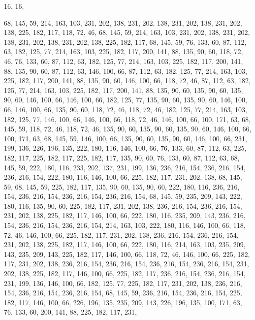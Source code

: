 16, 16,

68, 145, 59, 214, 163, 103, 231, 202, 138, 231, 202, 138, 231, 202, 138, 231,
202, 138, 225, 182, 117, 118, 72, 46, 68, 145, 59, 214, 163, 103, 231, 202,
138, 231, 202, 138, 231, 202, 138, 231, 202, 138, 225, 182, 117, 68, 145, 59,
76, 133, 60, 87, 112, 63, 182, 125, 77, 214, 163, 103, 225, 182, 117, 200,
141, 88, 135, 90, 60, 118, 72, 46, 76, 133, 60, 87, 112, 63, 182, 125,
77, 214, 163, 103, 225, 182, 117, 200, 141, 88, 135, 90, 60, 87, 112, 63,
146, 100, 66, 87, 112, 63, 182, 125, 77, 214, 163, 103, 225, 182, 117, 200,
141, 88, 135, 90, 60, 146, 100, 66, 118, 72, 46, 87, 112, 63, 182, 125,
77, 214, 163, 103, 225, 182, 117, 200, 141, 88, 135, 90, 60, 135, 90, 60,
135, 90, 60, 146, 100, 66, 146, 100, 66, 182, 125, 77, 135, 90, 60, 135,
90, 60, 146, 100, 66, 146, 100, 66, 135, 90, 60, 118, 72, 46, 118, 72,
46, 182, 125, 77, 214, 163, 103, 182, 125, 77, 146, 100, 66, 146, 100, 66,
118, 72, 46, 146, 100, 66, 100, 171, 63, 68, 145, 59, 118, 72, 46, 118,
72, 46, 135, 90, 60, 135, 90, 60, 135, 90, 60, 146, 100, 66, 100, 171,
63, 68, 145, 59, 146, 100, 66, 135, 90, 60, 135, 90, 60, 146, 100, 66,
231, 199, 136, 226, 196, 135, 222, 180, 116, 146, 100, 66, 76, 133, 60, 87,
112, 63, 225, 182, 117, 225, 182, 117, 225, 182, 117, 135, 90, 60, 76, 133,
60, 87, 112, 63, 68, 145, 59, 222, 180, 116, 233, 202, 137, 231, 199, 136,
236, 216, 154, 236, 216, 154, 236, 216, 154, 222, 180, 116, 146, 100, 66, 225,
182, 117, 231, 202, 138, 68, 145, 59, 68, 145, 59, 225, 182, 117, 135, 90,
60, 135, 90, 60, 222, 180, 116, 236, 216, 154, 236, 216, 154, 236, 216, 154,
236, 216, 154, 68, 145, 59, 235, 209, 143, 222, 180, 116, 135, 90, 60, 225,
182, 117, 231, 202, 138, 236, 216, 154, 236, 216, 154, 231, 202, 138, 225, 182,
117, 146, 100, 66, 222, 180, 116, 235, 209, 143, 236, 216, 154, 236, 216, 154,
236, 216, 154, 214, 163, 103, 222, 180, 116, 146, 100, 66, 118, 72, 46, 146,
100, 66, 225, 182, 117, 231, 202, 138, 236, 216, 154, 236, 216, 154, 231, 202,
138, 225, 182, 117, 146, 100, 66, 222, 180, 116, 214, 163, 103, 235, 209, 143,
235, 209, 143, 225, 182, 117, 146, 100, 66, 118, 72, 46, 146, 100, 66, 225,
182, 117, 231, 202, 138, 236, 216, 154, 236, 216, 154, 236, 216, 154, 236, 216,
154, 231, 202, 138, 225, 182, 117, 146, 100, 66, 225, 182, 117, 236, 216, 154,
236, 216, 154, 231, 199, 136, 146, 100, 66, 182, 125, 77, 225, 182, 117, 231,
202, 138, 236, 216, 154, 236, 216, 154, 236, 216, 154, 68, 145, 59, 236, 216,
154, 236, 216, 154, 225, 182, 117, 146, 100, 66, 226, 196, 135, 235, 209, 143,
226, 196, 135, 100, 171, 63, 76, 133, 60, 200, 141, 88, 225, 182, 117, 231,
